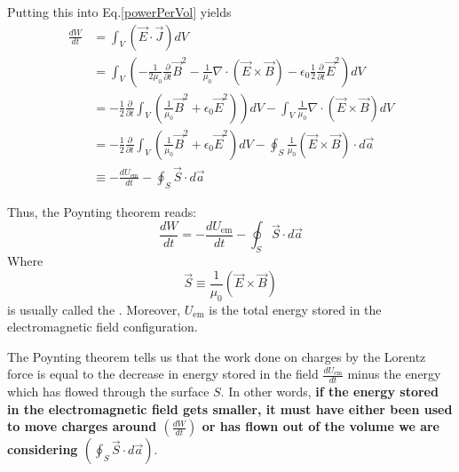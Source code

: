 Putting this into Eq.\ref{powerPerVol} yields
\begin{equation}
\begin{aligned}
\frac{d W}{d t} &=\int_{V}(\vec{E} \cdot \vec{J}) d V \\
&=\int_{V}\left(-\frac{1}{2 \mu_{0}} \frac{\partial}{\partial t} \vec{B}^{2}-\frac{1}{\mu_{0}} \nabla \cdot(\vec{E} \times \vec{B})-\epsilon_{0} \frac{1}{2} \frac{\partial}{\partial t} \vec{E}^{2}\right) d V \\
&\left.=-\frac{1}{2} \frac{\partial}{\partial t} \int_{V}\left(\frac{1}{\mu_{0}} \vec{B}^{2}+\epsilon_{0} \vec{E}^{2}\right)\right) d V-\int_{V} \frac{1}{\mu_{0}} \nabla \cdot(\vec{E} \times \vec{B}) d V \\
&=-\frac{1}{2} \frac{\partial}{\partial t} \int_{V}\left(\frac{1}{\mu_{0}} \vec{B}^{2}+\epsilon_{0} \vec{E}^{2}\right) d V-\oint_{S} \frac{1}{\mu_{0}}(\vec{E} \times \vec{B}) \cdot d \vec{a} \\
& \equiv-\frac{d U_{\mathrm{em}}}{d t}-\oint_{S} \vec{S} \cdot d \vec{a}
\end{aligned}
\end{equation}
\begin{qt}
Thus, the Poynting theorem reads:
\begin{equation}
    \frac{d W}{d t}=-\frac{d U_{\mathrm{em}}}{d t}-\oint_{S} \vec{S} \cdot d \vec{a}
\end{equation}
Where
\begin{equation}
\vec{S} \equiv \frac{1}{\mu_{0}}(\vec{E} \times \vec{B})
\end{equation}
is usually called the \textbf{}. Moreover, $U_{\mathrm{em}}$ is the total energy stored in the electromagnetic field configuration.
\end{qt}
The Poynting theorem tells us that the work done on charges by the Lorentz force is equal to the decrease in energy stored in the field $\frac{d U_{\mathrm{em}}}{d t}$ minus the energy which has flowed through the surface $S .$ In other words, \textbf{if the energy stored in the electromagnetic field gets smaller, it must have either been used to move charges around $\left(\frac{d W}{d t}\right)$ or has flown out of the volume we are considering $\left(\oint_{S} \vec{S} \cdot d \vec{a}\right) .$}

